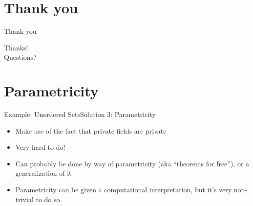 \documentclass{beamer}
\begin{document}
\section{Thank you}
\begin{frame}{Thank you}
  \noindent \Huge
  \noindent \begin{center}
    \noindent Thanks! \\ $\left.\right.$ \pause \\
    \noindent Questions?
  \end{center}
\end{frame}

\section*{Parametricity}
\begin{frame}{Example: Unordered Sets}{Solution 3: Parametricity}
  \begin{itemize}
    \item Make use of the fact that private fields are private \pause
    \item Very hard to do! \pause
    \item Can probably be done by way of parametricity (aka ``theorems for free''), or a generalization of it \pause
    \item Parametricity can be given a computational interpretation,
      but it's very non-trivial to do so
  \end{itemize}
\end{frame}
\end{document}
